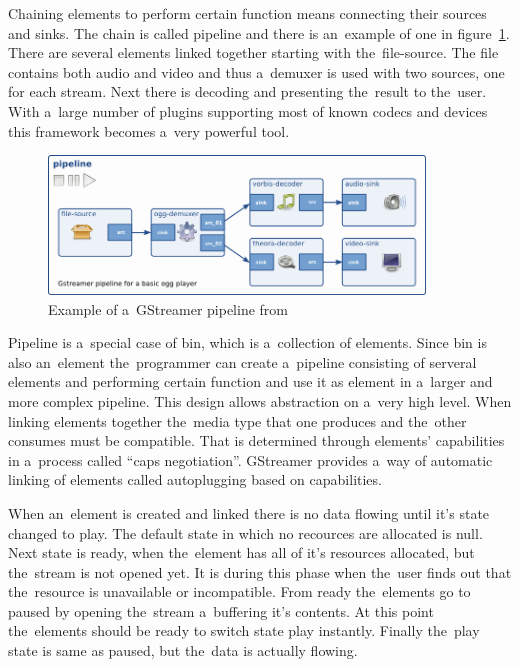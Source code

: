 Chaining elements to perform certain function means connecting their sources and sinks. The chain is called pipeline and there is an~example of one in figure~\ref{fig:gstreamerPipeline}. There are several elements linked together starting with the~file-source. The file contains both audio and video and thus a~demuxer is used with two sources, one for each stream. Next there is decoding and presenting the~result to the~user. With a~large number of plugins supporting most of known codecs and devices this framework becomes a~very powerful tool. 

\begin{figure}[ht]
	\begin{center}
	\includegraphics[width=10cm]{fig/gstreamer-pipeline.png}
	\caption{Example of a~GStreamer pipeline from \cite{gstreamer}}
	\label{fig:gstreamerPipeline}
\end{center}
\end{figure}

Pipeline is a~special case of bin, which is a~collection of elements. Since bin is also an~element the~programmer can create a~pipeline consisting of serveral elements and performing certain function and use it as element in a~larger and more complex pipeline. This design allows abstraction on a~very high level. When linking elements together the~media type that one produces and the~other consumes must be compatible. That is determined through elements' capabilities in a~process called ``caps negotiation''. GStreamer provides a~way of automatic linking of elements called autoplugging based on capabilities. 

When an~element is created and linked there is no data flowing until it's state changed to play. The default state in which no recources are allocated is null. Next state is ready, when the~element has all of it's resources allocated, but the~stream is not opened yet. It is during this phase when the~user finds out that the~resource is unavailable or incompatible. From ready the~elements go to paused by opening the~stream a~buffering it's contents. At this point the~elements should be ready to switch state play instantly. Finally the~play state is same as paused, but the~data is actually flowing. 

